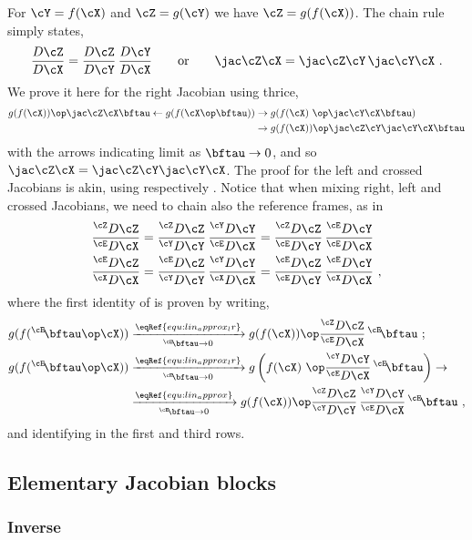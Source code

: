 For $\cY=f(\cX)$ and $\cZ=g(\cY)$ we have $\cZ=g(f(\cX))$. 
The chain rule simply states,
%
\begin{align}
\ndpar{\cZ}{\cX} = \ndpar{\cZ}{\cY}\,\ndpar{\cY}{\cX}
\qquad \textrm{or} \qquad
\mjac{\cZ}{\cX} = \mjac{\cZ}{\cY}\,\mjac{\cY}{\cX}
~.
\end{align}
%
We prove it here for the right Jacobian using  thrice,
%
\begin{align*}
g(f(\cX))\op\mjac{\cZ}{\cX}\bftau \gets g(f(\cX\op\bftau)) &\to g(f(\cX)~\op\mjac{\cY}{\cX}\bftau) 
 \\
 &\to g(f(\cX))\op\mjac{\cZ}{\cY}\mjac{\cY}{\cX}\bftau
\end{align*}
%
with the arrows indicating limit as $\bftau\to0$, and so $\mjac{\cZ}{\cX}=\mjac{\cZ}{\cY}\mjac{\cY}{\cX}$. 
The proof for the left and crossed Jacobians is akin, using respectively .
%
Notice that when mixing right, left and crossed Jacobians, we need to chain also the reference frames, as in \eg\ 
%
\begin{align}
\rldpar{\cZ}{\cX}
 &= \rrdpar{\cZ}{\cY}\,\rldpar{\cY}{\cX}
 = \rldpar{\cZ}{\cY}\,\lldpar{\cY}{\cX} \label{equ:chain_rule_cross_1}
\\
\lrdpar{\cZ}{\cX}
 &= \lrdpar{\cZ}{\cY}\,\rrdpar{\cY}{\cX}
 = \lldpar{\cZ}{\cY}\,\lrdpar{\cY}{\cX}\label{equ:chain_rule_cross_2}
~,
\end{align}
%
where the first identity of  is proven by writing,
%
\begin{align*}
g(f({^\cE\!\bftau}\op\cX)) 
 &\xrightarrow[{^\cE\!\bftau}\to0]{\eqRef{equ:lin_approx_lr}} 
 g(f(\cX))\op\rldpar{\cZ}{\cX}\,{^\cE}\!\bftau
 ~; \\ 
g(f({^\cE\!\bftau}\op\cX)) 
 &\xrightarrow[{^\cE\!\bftau}\to0]{\eqRef{equ:lin_approx_lr}} 
 g\left(f(\cX)~\op\rldpar{\cY}{\cX}\,{^\cE}\!\bftau\right) \to
 \\
 &\xrightarrow[{^\cE\!\bftau}\to0]{\eqRef{equ:lin_approx}} 
 g(f(\cX))\op\rrdpar{\cZ}{\cY}\,\rldpar{\cY}{\cX}\,{^\cE}\!\bftau 
~,
\end{align*}
%
and identifying  in the first and third rows.


\subsection{Elementary Jacobian blocks}
\label{sec:jacs_elementary}

\subsubsection{Inverse}
\label{sec:Jac_inversion}

